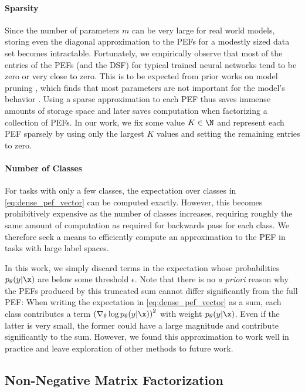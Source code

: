 \documentclass[dvipsnames]{article}
\begin{document}
\paragraph{Sparsity}
Since the number of parameters $m$ can be very large for real world models, storing even the diagonal approximation to the PEFs for a modestly sized data set becomes intractable.
Fortunately, we empirically observe that most of the entries of the PEFs (and the DSF) for typical trained neural networks tend to be zero or very close to zero.
This is to be expected from prior works on model pruning \citep{hoefler2021sparsity}, which finds that most parameters are not important for the model's behavior \citep{frankle2018lottery}.
Using a sparse approximation to each PEF thus saves immense amounts of storage space and later saves computation when factorizing a collection of PEFs.
In our work, we fix some value $K \in \N$ and represent each PEF sparsely by using only the largest $K$ values and setting the remaining entries to zero.

\paragraph{Number of Classes}
For tasks with only a few classes, the expectation over classes in \eqref{eq:dense_pef_vector} can be computed exactly.
However, this becomes prohibitively expensive as the number of classes increases, requiring roughly the same amount of computation as required for backwards pass for each class.
We therefore seek a means to efficiently compute an approximation to the PEF in tasks with large label spaces.

In this work, we simply discard terms in the expectation whose probabilities $p_\theta(y|\x)$ are below some threshold $\epsilon$.
Note that there is no \textit{a priori} reason why the PEFs produced by this truncated sum cannot differ significantly from the full PEF:
When writing the expectation in \eqref{eq:dense_pef_vector} as a sum, each class contributes a term $\left(\nabla_\theta \log p_\theta(y|\x)\right)^2$ with weight $p_\theta(y|\x)$.
Even if the latter is very small, the former could have a large magnitude and contribute significantly to the sum.
However, we found this approximation to work well in practice and leave exploration of other methods to future work.

\subsection{Non-Negative Matrix Factorization}
\end{document}
